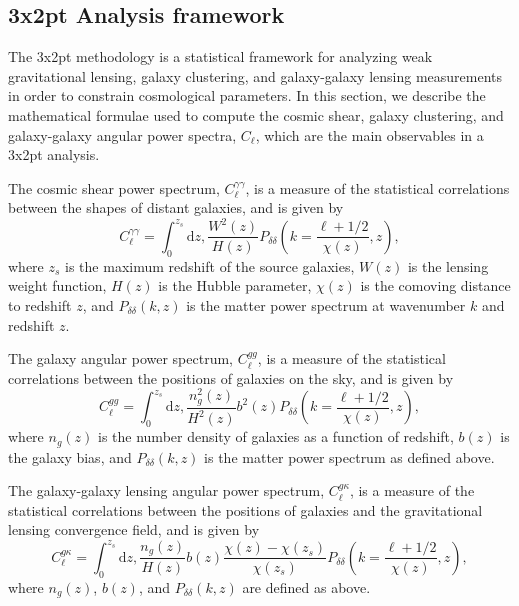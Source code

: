 \documentclass[twocolumn]{aastex631}
\begin{document}
\subsection{3x2pt Analysis framework}

The 3x2pt methodology is a statistical framework for analyzing weak gravitational lensing, galaxy clustering, and galaxy-galaxy lensing measurements in order to constrain cosmological parameters. In this section, we describe the mathematical formulae used to compute the cosmic shear, galaxy clustering, and galaxy-galaxy angular power spectra, $C_\ell$, which are the main observables in a 3x2pt analysis.

The cosmic shear power spectrum, $C_\ell^{\gamma\gamma}$, is a measure of the statistical correlations between the shapes of distant galaxies, and is given by
\begin{equation}
C_\ell^{\gamma\gamma} = \int_0^{z_s} \mathrm{d}z, \frac{W^2(z)}{H(z)} P_{\delta\delta}\left(k = \frac{\ell + 1/2}{\chi(z)}, z\right),
\end{equation}
where $z_s$ is the maximum redshift of the source galaxies, $W(z)$ is the lensing weight function, $H(z)$ is the Hubble parameter, $\chi(z)$ is the comoving distance to redshift $z$, and $P_{\delta\delta}(k, z)$ is the matter power spectrum at wavenumber $k$ and redshift $z$.

The galaxy angular power spectrum, $C_\ell^{gg}$, is a measure of the statistical correlations between the positions of galaxies on the sky, and is given by
\begin{equation}
C_\ell^{gg} = \int_0^{z_s} \mathrm{d}z, \frac{n_g^2(z)}{H^2(z)} b^2(z) P_{\delta\delta}\left(k = \frac{\ell + 1/2}{\chi(z)}, z\right),
\end{equation}
where $n_g(z)$ is the number density of galaxies as a function of redshift, $b(z)$ is the galaxy bias, and $P_{\delta\delta}(k, z)$ is the matter power spectrum as defined above.

The galaxy-galaxy lensing angular power spectrum, $C_\ell^{g\kappa}$, is a measure of the statistical correlations between the positions of galaxies and the gravitational lensing convergence field, and is given by
\begin{equation}
C_\ell^{g\kappa} = \int_0^{z_s} \mathrm{d}z, \frac{n_g(z)}{H(z)} b(z) \frac{\chi(z) - \chi(z_s)}{\chi(z_s)} P_{\delta\delta}\left(k = \frac{\ell + 1/2}{\chi(z)}, z\right),
\end{equation}
where $n_g(z)$, $b(z)$, and $P_{\delta\delta}(k, z)$ are defined as above.
\end{document}
